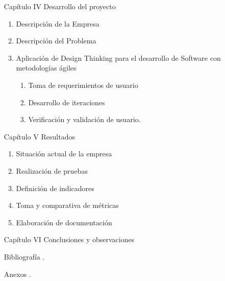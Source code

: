 \documentclass[12pt,article]{article}
\begin{document}
\begin{enumerate}
	\item[Capítulo IV] Desarrollo del proyecto 
		\begin{enumerate}[label=4.\arabic*]
			\item Descripción de la Empresa 
			\item Descripción del Problema 
			\item Aplicación de Design Thinking para el desarrollo de Software con metodologías ágiles
				\begin{enumerate}[label=4.3.\arabic*]
					\item Toma de requerimientos de usuario
					\item Desarrollo de iteraciones
					\item Verificación y validación de usuario.		
				\end{enumerate}		
		\end{enumerate}
	\item [Capítulo V] Resultados 
		\begin{enumerate}[label=5.\arabic*]
			\item Situación actual de la empresa 
			\item Realización de pruebas
			\item Definición de indicadores
			\item Toma y comparativa de métricas 
			\item Elaboración de documentación 
		
		\end{enumerate}
	\item [Capítulo VI] Conclusiones y observaciones 
	\item [Bibliografía].
	\item [Anexos].
		 	
	
\end{enumerate}
\end{document}

